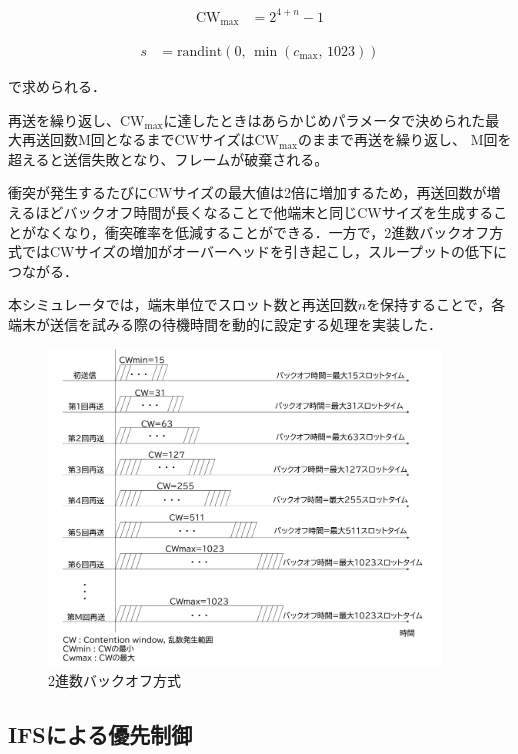 \documentclass[a4paper,10pt]{ltjsarticle}
\begin{document}
\begin{align}
  \mathrm{CW}_{\max} &= 2^{4 + n} - 1
\end{align}

\begin{align}
  s &= \mathrm{randint}(0, \, \min(c_{\max}, \, 1023))
  \label{slot}
\end{align}

で求められる．

再送を繰り返し、$\mathrm{CW_{max}}$に達したときはあらかじめパラメータで決められた最大再送回数M回となるまでCWサイズは$\mathrm{CW_{max}}$のままで再送を繰り返し、
M回を超えると送信失敗となり、フレームが破棄される。

衝突が発生するたびにCWサイズの最大値は2倍に増加するため，再送回数が増えるほどバックオフ時間が長くなることで他端末と同じCWサイズを生成することがなくなり，衝突確率を低減することができる．一方で，2進数バックオフ方式ではCWサイズの増加がオーバーヘッドを引き起こし，スループットの低下につながる．


本シミュレータでは，端末単位でスロット数と再送回数$n$を保持することで，各端末が送信を試みる際の待機時間を動的に設定する処理を実装した．

\begin{figure}[H]
  \centering
  \includegraphics[width=0.93\textwidth]{./assets/CW_.png}
  \caption{2進数バックオフ方式}
  \label{binary-backoff}
\end{figure}

\clearpage

\subsection{IFSによる優先制御}
\end{document}
